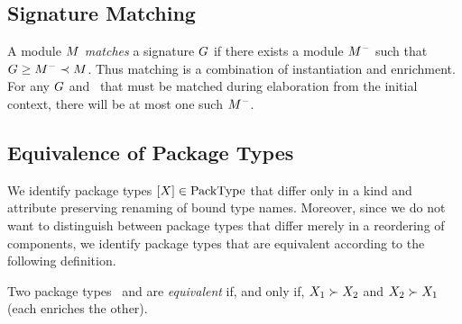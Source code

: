 
\subsection{Signature Matching}
\label{sigmatch-sec}
A module $M$ {\sl matches} a signature $G$ if there exists
a module $M^-$ such that $G\geq M^-\prec M$. Thus matching
is a combination of instantiation and enrichment. For any $G$
and \M\ that must be matched 
during elaboration from the initial context, there
will be at most one such $M^-$.

\subsection{Equivalence of Package Types}
\label{packagetype-equivalence}
We identify package types ${[}{X}{]} \in{\rm PackType}$ that
differ only in a kind and attribute preserving renaming of bound
type names.
Moreover, since we do not want to distinguish between package types
that differ merely in a reordering of components, we 
identify package types that are equivalent according to the following
definition.

\label{packagetype-equivalence}
Two package types \ and
 are {\sl equivalent} if, and only if,
$X_1\succ X_2$ and $X_2\succ X_1$ (each enriches the other).

% 




